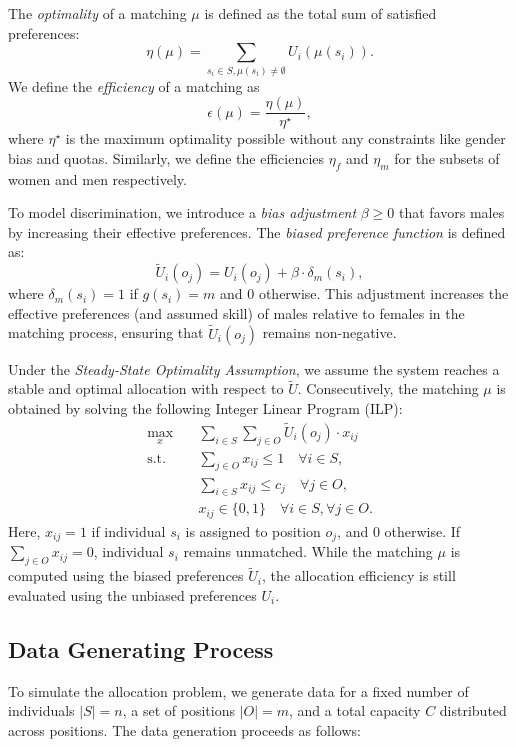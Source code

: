 \documentclass[letterpaper]{article}
\begin{document}
The \textit{optimality} of a matching \( \mu \) is defined as the total sum of satisfied preferences:
\[
\eta(\mu) = \sum_{s_i \in S, \mu(s_i) \neq \emptyset} U_i(\mu(s_i)).
\]
We define the \textit{efficiency} of a matching as
\[
\epsilon(\mu)=\frac{\eta(\mu)}{\eta^{\star}},
\]
where \(\eta^{\star}\) is the maximum optimality possible without any constraints like gender bias and quotas. Similarly, we define the efficiencies \( \eta_f \) and \( \eta_m\) for the subsets of women and men respectively.

To model discrimination, we introduce a \textit{bias adjustment} \( \beta \geq 0 \) that favors males by increasing their effective preferences. The \textit{biased preference function} is defined as:
\[
\tilde{U}_i(o_j) = U_i(o_j) + \beta \cdot \delta_m(s_i),
\]
where \( \delta_m(s_i) = 1 \) if \( g(s_i) = m \) and \( 0 \) otherwise. This adjustment increases the effective preferences (and assumed skill) of males relative to females in the matching process, ensuring that \( \tilde{U}_i(o_j) \) remains non-negative.


Under the \textit{Steady-State Optimality Assumption}, we assume the system reaches a stable and optimal allocation with respect to \( \tilde{U} \). Consecutively, the matching \( \mu \) is obtained by solving the following Integer Linear Program (ILP):
\begin{align*}
\max_{x} \quad & \sum_{i \in S} \sum_{j \in O} \tilde{U}_i(o_j) \cdot x_{ij} \\
\text{s.t.} \quad & \sum_{j \in O} x_{ij} \leq 1 \quad \forall i \in S, \\
& \sum_{i \in S} x_{ij} \leq c_j \quad \forall j \in O, \\
& x_{ij} \in \{0, 1\} \quad \forall i \in S, \forall j \in O.
\end{align*}
Here, \( x_{ij} = 1 \) if individual \( s_i \) is assigned to position \( o_j \), and \( 0 \) otherwise. If \( \sum_{j \in O} x_{ij} = 0 \), individual \( s_i \) remains unmatched. While the matching \( \mu \) is computed using the biased preferences \( \tilde{U}_i \), the allocation efficiency is still evaluated using the unbiased preferences \( U_i \).

\subsection*{Data Generating Process}

To simulate the allocation problem, we generate data for a fixed number of individuals \( |S| = n \), a set of positions \( |O| = m \), and a total capacity \( C \) distributed across positions. The data generation proceeds as follows:
\end{document}
